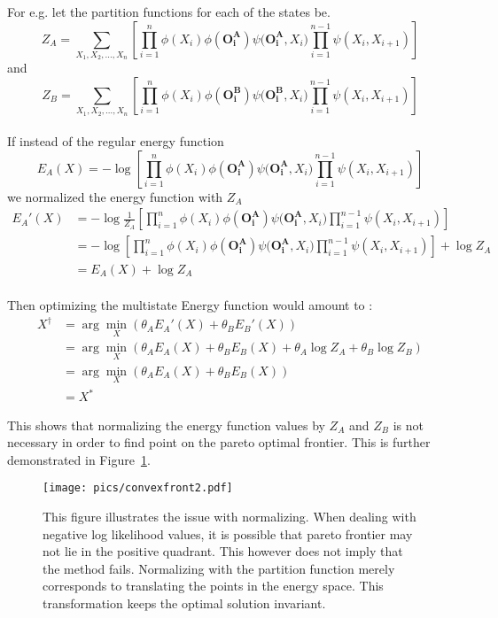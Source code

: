 \documentclass{article}
\begin{document}
For e.g. let the partition functions for each of the states be.
\[
Z_A = \sum_{X_1,X_2,\dotsc,X_n}\left[{\prod_{i=1}^{n}{\phi(X_i)\phi(\mathbf{O^A_i})\psi(\mathbf{O^A_i},X_i})\prod_{i=1}^{n-1}{\psi(X_i,X_{i+1})}}\right]
\]
and 
\[
Z_B = \sum_{X_1,X_2,\dotsc,X_n}\left[{\prod_{i=1}^{n}{\phi(X_i)\phi(\mathbf{O^B_i})\psi(\mathbf{O^B_i},X_i})\prod_{i=1}^{n-1}{\psi(X_i,X_{i+1})}}\right]
\]
\\
If instead of the regular energy function 
\[
E_A(X) = -\log  \left[{\prod_{i=1}^{n}{\phi(X_i)\phi(\mathbf{O^A_i})\psi(\mathbf{O^A_i},X_i})\prod_{i=1}^{n-1}{\psi(X_i,X_{i+1})}}\right]
\]
we normalized the energy function with $Z_A$
\[
\begin{split}
E_A'(X) &= -\log  \frac{1}{Z_A} \left[{\prod_{i=1}^{n}{\phi(X_i)\phi(\mathbf{O^A_i})\psi(\mathbf{O^A_i},X_i})\prod_{i=1}^{n-1}{\psi(X_i,X_{i+1})}}\right]\\
 &= -\log   \left[{\prod_{i=1}^{n}{\phi(X_i)\phi(\mathbf{O^A_i})\psi(\mathbf{O^A_i},X_i})\prod_{i=1}^{n-1}{\psi(X_i,X_{i+1})}}\right] + \log Z_A \\
	&= E_A(X) + \log Z_A
\end{split}
\]
\\
Then optimizing the multistate Energy function would amount to : 
\[
\begin{split}
X^{\dagger} &= \arg \min_X \left( \theta_A E_A'(X)  + \theta_B E_B'(X) \right) \\
 &= \arg \min_X \left( \theta_A E_A(X) + \theta_B E_B(X) + \theta_A \log Z_A + \theta_B \log Z_B \right) \\
 &= \arg \min_X \left( \theta_A E_A(X) + \theta_B E_B(X) \right) \\
  &= X^*
\end{split}
\]

This shows that normalizing the energy function values by $Z_A$ and $Z_B$ is not necessary in order to find point on the pareto optimal frontier. This is further demonstrated in Figure~\ref{fig:cvxfront2}.


\begin{figure}[h!]
    \centering
    \texttt{[image: pics/convexfront2.pdf]}
    \caption{This figure illustrates the issue with normalizing. When dealing with negative log likelihood values, it is possible that pareto frontier may not lie in the positive quadrant. This however does not imply that the method fails. Normalizing with the partition function merely corresponds to translating the points in the energy space. This transformation keeps the optimal solution invariant.  }
    \label{fig:cvxfront2}
\end{figure}
\pagebreak
\end{document}
